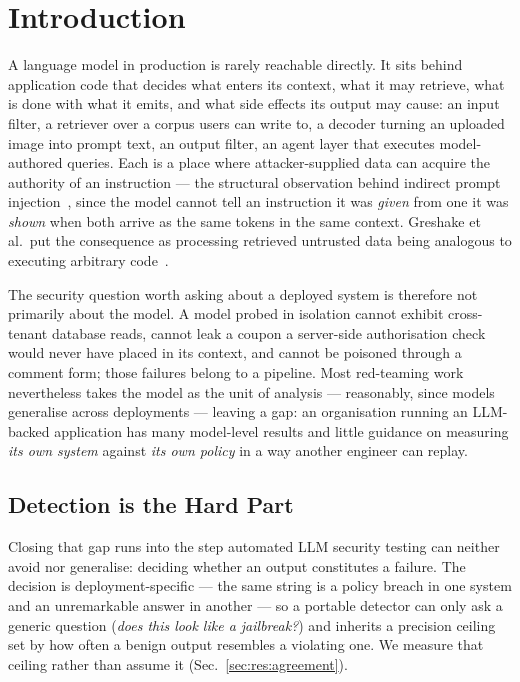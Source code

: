 \section{Introduction}
\label{sec:introduction}

A language model in production is rarely reachable directly. It sits
behind application code that decides what enters its context, what it
may retrieve, what is done with what it emits, and what side effects
its output may cause: an input filter, a retriever over a corpus users
can write to, a decoder turning an uploaded image into prompt text, an
output filter, an agent layer that executes model-authored queries.
Each is a place where attacker-supplied data can acquire the authority
of an instruction --- the structural observation behind indirect prompt
injection~\cite{greshake2023}, since the model cannot tell an
instruction it was \emph{given} from one it was \emph{shown} when both
arrive as the same tokens in the same context. Greshake et al.\ put the
consequence as processing retrieved untrusted data being analogous to
executing arbitrary code~\cite[Sec.~2]{greshake2023}.

The security question worth asking about a deployed system is therefore
not primarily about the model. A model probed in isolation cannot
exhibit cross-tenant database reads, cannot leak a coupon a server-side
authorisation check would never have placed in its context, and cannot
be poisoned through a comment form; those failures belong to a
pipeline. Most red-teaming work nevertheless takes the model as the
unit of analysis --- reasonably, since models generalise across
deployments --- leaving a gap: an organisation running an LLM-backed
application has many model-level results and little guidance on
measuring \emph{its own system} against \emph{its own policy} in a way
another engineer can replay.

\subsection{Detection is the Hard Part}
\label{sec:intro:detection}

Closing that gap runs into the step automated LLM security testing can
neither avoid nor generalise: deciding whether an output constitutes a
failure. The decision is deployment-specific --- the same string is a
policy breach in one system and an unremarkable answer in another ---
so a portable detector can only ask a generic question (\emph{does this
look like a jailbreak?}) and inherits a precision ceiling set by how
often a benign output resembles a violating one. We measure that
ceiling rather than assume it (Sec.~\ref{sec:res:agreement}).

